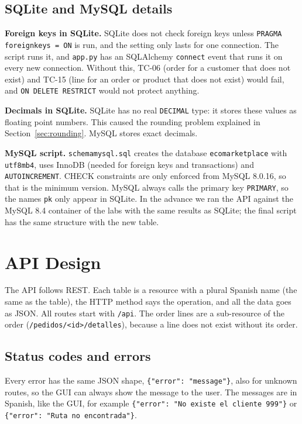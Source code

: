 \documentclass[11pt]{article}
\renewcommand{\_}{\oldus\allowbreak}
\begin{document}
\subsection{SQLite and MySQL details}

\textbf{Foreign keys in SQLite.} SQLite does not check foreign keys unless
\texttt{PRAGMA foreign\_keys = ON} is run, and the setting only lasts for one connection. The script
runs it, and \texttt{app.py} has an SQLAlchemy \texttt{connect} event that runs it on every new
connection. Without this, TC-06 (order for a customer that does not exist) and TC-15 (line for an
order or product that does not exist) would fail, and \texttt{ON DELETE RESTRICT} would not protect
anything.

\textbf{Decimals in SQLite.} SQLite has no real \texttt{DECIMAL} type: it stores these values as
floating point numbers. This caused the rounding problem explained in Section~\ref{sec:rounding}.
MySQL stores exact decimals.

\textbf{MySQL script.} \texttt{schema\_mysql.sql} creates the database \texttt{eco\_marketplace}
with \texttt{utf8mb4}, uses InnoDB (needed for foreign keys and transactions) and
\texttt{AUTO\_INCREMENT}. CHECK constraints are only enforced from MySQL 8.0.16, so that is the
minimum version. MySQL always calls the primary key \texttt{PRIMARY}, so the names \texttt{pk\_*}
only appear in SQLite. In the advance we ran the API against the MySQL 8.4 container of the labs
with the same results as SQLite; the final script has the same structure with the new table.

\section{API Design}

The API follows REST. Each table is a resource with a plural Spanish name (the same as the table),
the HTTP method says the operation, and all the data goes as JSON. All routes start with
\texttt{/api}. The order lines are a sub-resource of the order
(\texttt{/pedidos/<id>/detalles}), because a line does not exist without its order.

\subsection{Status codes and errors}

Every error has the same JSON shape, \texttt{\{"error": "message"\}}, also for unknown routes, so the
GUI can always show the message to the user. The messages are in Spanish, like the GUI, for example
\texttt{\{"error": "No existe el cliente 999"\}} or \texttt{\{"error": "Ruta no encontrada"\}}.
\end{document}
